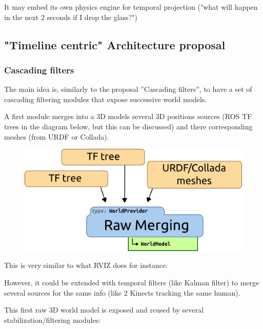 \documentclass[a4paper]{article}
\begin{document}
It may embed its own physics engine for temporal projection ("what will happen
in the next 2 seconds if I drop the glass?") 

\FloatBarrier
\subsection{"Timeline centric" Architecture proposal}

\subsubsection{Cascading filters}

The main idea is, similarly to the proposal ''Cascading filters'', to have a
set of cascading filtering modules that expose successive world models.

A first module merges into a 3D models several 3D positions sources (ROS TF
trees in the diagram below, but this can be discussed) and there corresponding
meshes (from URDF or Collada).

\begin{figure}[!h]
    \centering
    \includegraphics[scale=0.5]{images/spark2_archi2_1.png}
\end{figure}

This is very similar to what RVIZ does for instance.

However, it could be extended with temporal filters (like Kalman filter) to
merge several sources for the same info (like 2 Kinects tracking the same
human).

This first raw 3D world model is exposed and reused by several
stabilization/filtering modules:
\end{document}
